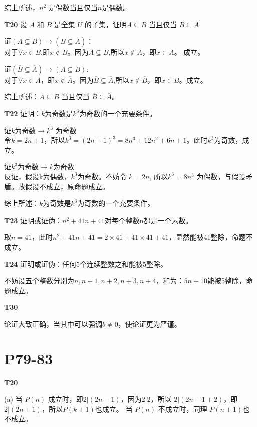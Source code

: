 \documentclass[12pt, a4paper]{ctexart}
\begin{document}
综上所述，$n^2$ 是偶数当且仅当$n$是偶数。

\textbf{T20} 设 $A$ 和 $B$ 是全集 $U$ 的子集，证明$A \subseteq B$ 当且仅当 $\overline{B} \subseteq \overline{A}$

证$(A \subseteq B) \rightarrow (\overline{B} \subseteq \overline{A})$：\\
对于$\forall x \in \overline{B}$,即$x \notin B$。因为$A \subseteq B$,所以$x \notin A$，即$x \in \overline{A}$。 成立。

证$(\overline{B} \subseteq \overline{A}) \rightarrow (A \subseteq B)$:\\
对于$\forall x \in A$，即$x \notin \overline{A}$。因为$\overline{B} \subseteq \overline{A}$,所以$x \notin \overline{B}$，即$x \in B$。成立。

综上所述：$A \subseteq B$ 当且仅当 $\overline{B} \subseteq \overline{A}$。

\textbf{T22} 证明：$k$为奇数是$k^3$为奇数的一个充要条件。

证$k$为奇数$\rightarrow k^3$ 为奇数\\
令$k = 2n + 1$，所以$k^3 = (2n + 1)^3 = 8n^3 + 12n^2 + 6n + 1$。此时$k^3$为奇数，成立。

证$k^3$为奇数$\rightarrow k$为奇数\\
反证，假设k为偶数，$k^3$为奇数。不妨令 $k = 2n$, 所以$k^3 = 8n^3$ 为偶数，与假设矛盾。故假设不成立，原命题成立。

综上所述：$k$为奇数是$k^3$为奇数的一个充要条件。

\textbf{T23} 证明或证伪：$n^2 + 41n + 41$对每个整数n都是一个素数。

取$n = 41$，此时$n^2 + 41n + 41 = 2 \times 41 + 41 \times 41 + 41$，显然能被41整除，命题不成立。

\textbf{T24} 证明或证伪：任何5个连续整数之和能被5整除。

不妨设五个整数分别为$n, n + 1, n + 2, n + 3, n + 4$，和为：$5n + 10$能被5整除，命题成立。

\textbf{T30} 

论证大致正确，当其中可以强调$b \neq 0$，使论证更为严谨。

\section{\textbf{P79-83}}

\textbf{T20}

(a) 当 $P(n)$ 成立时，即$2 | (2n - 1)$，因为$2 | 2$，所以 $2 | (2n - 1 + 2)$，即$2 | (2n + 1)$，所以$P(k + 1)$也成立。
当 $P(n)$ 不成立时，同理 $P(n + 1)$也不成立。
\end{document}

